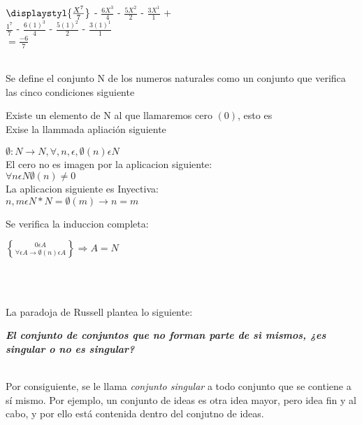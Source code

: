 \documentclass{report}%
\begin{document}
{{$ \displaystyl{ \frac{X^7}{7} }$ -
$ \displaystyle{ \frac{6X^3}{4} }$ -
$ \displaystyle{ \frac{5X^2}{2} }$ -
$ \displaystyle{ \frac{3X^1}{1} }$ +
\\



$ \displaystyle{ \frac{1^7}{7} }$ -
$ \displaystyle{ \frac{6(1)^3}{4} }$ -
$ \displaystyle{ \frac{5(1)^2}{2} }$ -
$ \displaystyle{\frac{3(1)^1}{1} }$ 
\\

$ \displaystyle{=\frac{-6}{7} }$ 
}\\
\\
{\small

Se define el conjunto N de los numeros naturales como un conjunto que verifica las 
cinco condiciones siguiente

Existe un elemento de N al que llamaremos cero $(0)$, esto es\\ 
Exise  la llammada apliación siguiente

$ \emptyset:N\rightarrow N, \forall, n ,\epsilon ,\emptyset (n) \epsilon N  $\\

El cero no es imagen por la aplicacion siguiente:\\
 $ \forall n \epsilon N \emptyset (n) \neq 0  $\\
 
La aplicacion siguiente es Inyectiva:\\

$n,m \epsilon N*N= \emptyset (m) \rightarrow n=m  $

Se verifica la induccion completa:

${0 \epsilon A \brace \forall \epsilon A \rightarrow \emptyset (n) \epsilon A} \Rightarrow
 A = N$
}\\

\\
{\small
La paradoja de Russell plantea lo siguiente: 
\begin{center}
{\it \bf \noindent El conjunto de conjuntos que no forman parte de sì mismos, ¿es singular o no es singular?} 
\end{center}\\

Por consiguiente, se le llama {\em conjunto singular} a todo conjunto que se contiene a sí mismo.  Por ejemplo, un conjunto de ideas es otra idea mayor, pero idea fin y al cabo, y por ello está contenida dentro del conjutno de ideas.\\ 

}}
\end{document}
